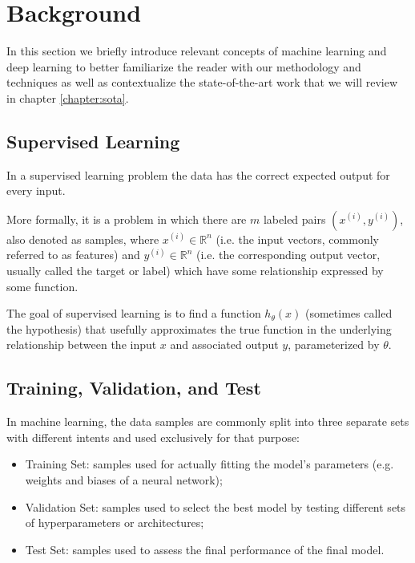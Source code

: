 \chapter{Background}
\label{chapter:background}

In this section we briefly introduce relevant concepts of machine learning and deep learning to better familiarize the reader with our methodology and techniques as well as contextualize the state-of-the-art work that we will review in chapter \ref{chapter:sota}.

\section{Supervised Learning}

In a supervised learning problem the data has the correct expected output for every input.

More formally, it is a problem in which there are $m$ labeled pairs $(x^{(i)}, y^{(i)})$, also denoted as samples, where $x^{(i)} \in \mathbb{R}^n$ (i.e. the input vectors, commonly referred to as features) and $y^{(i)} \in \mathbb{R}^n$ (i.e. the corresponding output vector, usually called the target or label) which have some relationship expressed by some function.

The goal of supervised learning is to find a function $h_{\theta}(x)$ (sometimes called the hypothesis) that usefully approximates the true function in the underlying relationship between the input $x$ and associated output $y$, parameterized by $\theta$.

\section{Training, Validation, and Test}

In machine learning, the data samples are commonly split into three separate sets with different intents and used exclusively for that purpose:

\begin{itemize}
    \item Training Set: samples used for actually fitting the model's parameters (e.g. weights and biases of a neural network);
    \item Validation Set: samples used to select the best model by testing different sets of hyperparameters or architectures;
    \item Test Set: samples used to assess the final performance of the final model.
\end{itemize}

